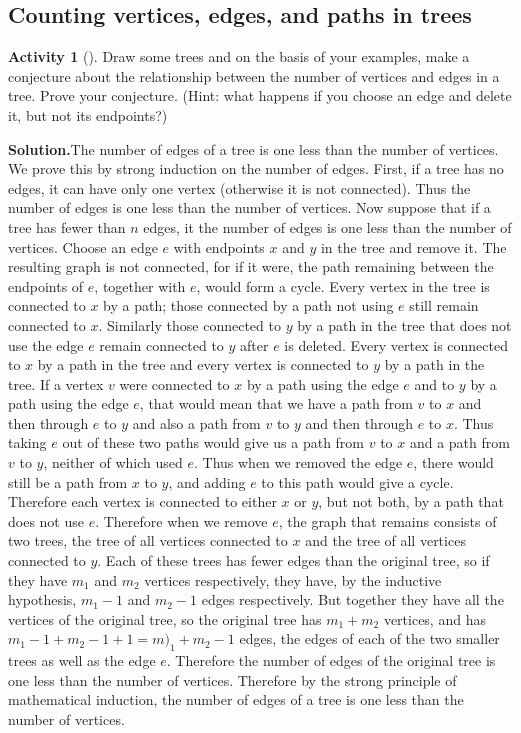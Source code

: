 \documentclass[10pt,]{book}
\theoremstyle{plain}
\theoremstyle{definition}
\newtheorem{activity}[project]{Activity}
\numberwithin{equation}{chapter}
\begin{document}
\subsection[{Counting vertices, edges, and paths in trees}]{Counting vertices, edges, and paths in trees}\label{subsection-17}
\begin{activity}[]\label{Noverticesandedgesoftree}
Draw some trees and on the basis of your examples, make a conjecture about the relationship between the number of vertices and edges in a tree. Prove your conjecture. (Hint: what happens if you choose an edge and delete it, but not its endpoints?)%
\par\medskip\noindent%
\textbf{Solution.}\quad The number of edges of a tree is one less than the number of vertices. We prove this by strong induction on the number of edges. First, if a tree has no edges, it can have only one vertex (otherwise it is not connected). Thus the number of edges is one less than the number of vertices. Now suppose that if a tree has fewer than \(n\) edges, it the number of edges is one less than the number of vertices. Choose an edge \(e\) with endpoints \(x\) and \(y\) in the tree and remove it. The resulting graph is not connected, for if it were, the path remaining between the endpoints of \(e\), together with \(e\), would form a cycle. Every vertex in the tree is connected to \(x\) by a path; those connected by a path not using \(e\) still remain connected to \(x\). Similarly those connected to \(y\) by a path in the tree that does not use the edge \(e\) remain connected to \(y\) after \(e\) is deleted. Every vertex is connected to \(x\) by a path in the tree and every vertex is connected to \(y\) by a path in the tree. If a vertex \(v\) were connected to \(x\) by a path using the edge \(e\) and to \(y\) by a path using the edge \(e\), that would mean that we have a path from \(v\) to \(x\) and then through \(e\) to \(y\) and also a path from \(v\) to \(y\) and then through \(e\) to \(x\). Thus taking \(e\) out of these two paths would give us a path from \(v\) to \(x\) and a path from \(v\) to \(y\), neither of which used \(e\). Thus when we removed the edge \(e\), there would still be a path from \(x\) to \(y\), and adding \(e\) to this path would give a cycle. Therefore each vertex is connected to either \(x\) or \(y\), but not both, by a path that does not use \(e\). Therefore when we remove \(e\), the graph that remains consists of two trees, the tree of all vertices connected to \(x\) and the tree of all vertices connected to \(y\). Each of these trees has fewer edges than the original tree, so if they have \(m_1\) and \(m_2\) vertices respectively, they have, by the inductive hypothesis, \(m_1-1\) and \(m_2-1\) edges respectively. But together they have all the vertices of the original tree, so the original tree has \(m_1+m_2\) vertices, and has \(m_1-1+m_2-1 +1=m)_1+m_2-1\) edges, the edges of each of the two smaller trees as well as the edge \(e\). Therefore the number of edges of the original tree is one less than the number of vertices. Therefore by the strong principle of mathematical induction, the number of edges of a tree is one less than the number of vertices.%
\end{activity}
\end{document}
